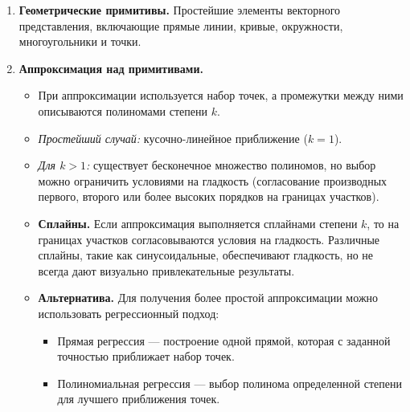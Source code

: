 \begin{enumerate}[label=\textbf{\arabic*.}, leftmargin=1.5em]

    \item \textbf{Геометрические примитивы.}
          Простейшие элементы векторного представления, включающие прямые линии, кривые, окружности, многоугольники и точки.

    \item \textbf{Аппроксимация над примитивами.}
          \begin{itemize}
              \item При аппроксимации используется набор точек, а промежутки между ними описываются полиномами степени \( k \).
              \item \textit{Простейший случай:} кусочно-линейное приближение (\( k = 1 \)).
              \item \textit{Для \( k > 1 \):} существует бесконечное множество полиномов, но выбор можно ограничить условиями на гладкость (согласование производных первого, второго или более высоких порядков на границах участков).
              \item \textbf{Сплайны.} Если аппроксимация выполняется сплайнами степени \( k \), то на границах участков согласовываются условия на гладкость. Различные сплайны, такие как синусоидальные, обеспечивают гладкость, но не всегда дают визуально привлекательные результаты.
              \item \textbf{Альтернатива.} Для получения более простой аппроксимации можно использовать регрессионный подход:
                    \begin{itemize}
                        \item Прямая регрессия — построение одной прямой, которая с заданной точностью приближает набор точек.
                        \item Полиномиальная регрессия — выбор полинома определенной степени для лучшего приближения точек.


\end{itemize}
\end{itemize}
\end{enumerate}
